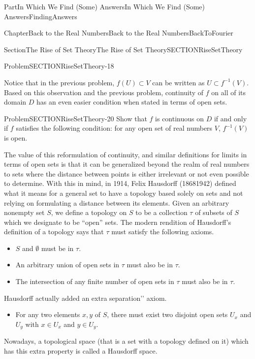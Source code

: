 \documentclass[oneside,10pt,]{book}
\numberwithin{equation}{part}
\begin{document}
\begin{partptx}{Part}{In Which We Find (Some) Answers}{}{In Which We Find (Some) Answers}{}{}{FindingAnswers}
\begin{chapterptx}{Chapter}{Back to the Real Numbers}{}{Back to the Real Numbers}{}{}{BackToFourier}
\begin{sectionptx}{Section}{The Rise of Set Theory}{}{The Rise of Set Theory}{}{}{SECTIONRiseSetTheory}
\begin{problem}{Problem}{}{SECTIONRiseSetTheory-18}
\end{problem}
Notice that in the previous problem, \(f\left(U\right)\subset
V\) can be written as \(U\subset f^{-1}(V)\).  Based on this observation and the previous problem, continuity of \(f\) on all of its domain \(D\) has an even easier condition when stated in terms of open sets.%
\begin{problem}{Problem}{}{SECTIONRiseSetTheory-20}%
Show that \(f\) is continuous on \(D\) if and only if \(f\) satisfies the following condition: for any open set of real numbers \(V\), \(f^{-1}(V)\) is open.%
\end{problem}
The value of this reformulation of continuity, and similar definitions for limits in terms of open sets is that it can be generalized beyond the realm of real numbers to sets where the distance between points is either irrelevant or not even possible to determine.  With this in mind, in 1914, Felix Hausdorff (1868\textendash{}1942) defined what it means for a general set to have a topology based solely on sets and not relying on formulating a distance between its elements. Given an arbitrary nonempty set \(S\), we define a topology on \(S\) to be a collection \(\tau \) of subsets of \(S\) which we designate to be ``open'' sets.  The modern rendition of Hausdorff's definition of a topology says that \(\tau \) must satisfy the following axioms.%
\par
%
\begin{itemize}[label=\textbullet]
\item{}\(S\) and \(\emptyset \) must be in \(\tau \).%
\item{}An arbitrary union of open sets in \(\tau \) must also be in \(\tau \).%
\item{}The intersection of any finite number of open sets in \(\tau \) must also be in \(\tau \).%
\end{itemize}
%
\par
Hausdorff actually added an extra \textasciigrave{}\textasciigrave{}separation'{}'{} axiom.%
\par
%
\begin{itemize}[label=\textbullet]
\item{}For any two elements \(x,y\) of \(S\), there must exist two disjoint open sets \(U_x\) and \(U_y\) with \(x\in U_x\) and \(y\in U_y\).%
\end{itemize}
%
\par
Nowadays, a topological space (that is a set with a topology defined on it) which has this extra property is called a Hausdorff space.%
\par

\end{sectionptx}
\end{chapterptx}
\end{partptx}
\end{document}
